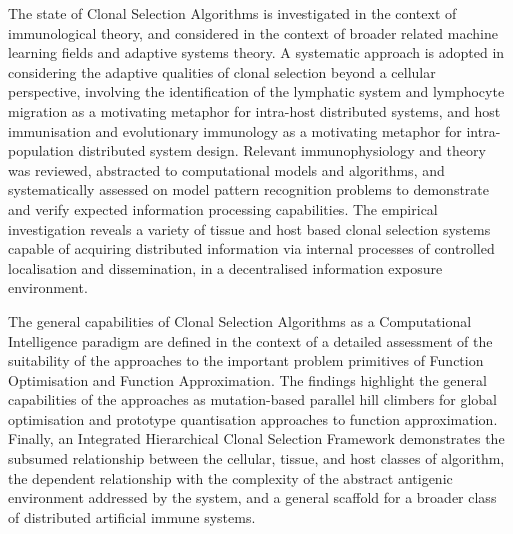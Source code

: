 The state of Clonal Selection Algorithms is investigated in the context of immunological theory, and considered in the context of broader related machine learning fields and adaptive systems theory. A systematic approach is adopted in considering the adaptive qualities of clonal selection beyond a cellular perspective, involving the identification of the lymphatic system and lymphocyte migration as a motivating metaphor for intra-host distributed systems, and host immunisation and evolutionary immunology as a motivating metaphor for intra-population distributed system design. Relevant immunophysiology and theory was reviewed, abstracted to computational models and algorithms, and systematically assessed on model pattern recognition problems to demonstrate and verify expected information processing capabilities.
The empirical investigation reveals a variety of tissue and host based clonal selection systems capable of acquiring distributed information via internal processes of controlled localisation and dissemination, in a decentralised information exposure environment.

The general capabilities of Clonal Selection Algorithms as a Computational Intelligence paradigm are defined in the context of a detailed assessment of the suitability of the approaches to the important problem primitives of Function Optimisation and Function Approximation. The findings highlight the general capabilities of the approaches as mutation-based parallel hill climbers for global optimisation and prototype quantisation approaches to function approximation.
Finally, an Integrated Hierarchical Clonal Selection Framework demonstrates the subsumed relationship between the cellular, tissue, and host classes of algorithm, the dependent relationship with the complexity of the abstract antigenic environment addressed by the system, and a general scaffold for a broader class of distributed artificial immune systems. 


